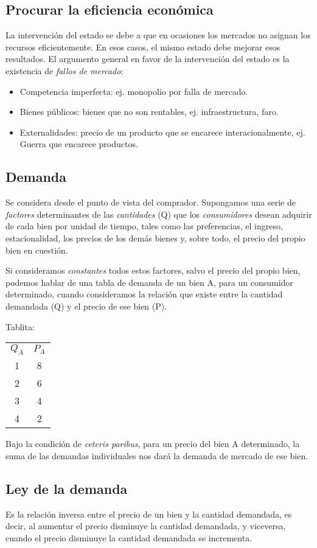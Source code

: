 \subsection{Procurar la eficiencia económica}

La intervención del estado se debe a que en ocasiones 
los mercados no asignan los recursos eficientemente.
En esos casos, 
el mismo estado debe mejorar esos resultados.
El argumento general en favor de la intervención del estado es la existencia de \textit{fallos de mercado}:
\begin{itemize}
    \item Competencia imperfecta: ej. monopolio por falla de mercado.
    \item Bienes públicos: bienes que no son rentables, ej. infraestructura, faro.
    \item Externalidades: precio de un producto que se encarece interacionalmente, 
    ej. Guerra que encarece productos.
\end{itemize}

\subsection{Demanda}

Se considera desde el punto de vista del comprador.
Supongamos una serie de \textit{factores} determinantes de las \textit{cantidades} (Q)
que los \textit{consumidores} desean adquirir de cada bien por unidad de tiempo,
tales como las preferencias, el ingreso, 
estacionalidad, los precios de los demás bienes y, sobre todo,
el precio del propio bien en cuestión.

Si consideramos \textit{constantes} todos estos factores, 
salvo el precio del propio bien,
podemos hablar de una tabla de demanda de un bien A,
para un consumidor determinado,
cuando consideramos la relación que existe entre la cantidad demandada (Q)
y el precio de ese bien (P).

Tablita:

\begin{tabular}{ c c }
    \(Q_A\) & \(P_A\) \\
    1& 8 \\
    2& 6 \\
    3& 4 \\
    4& 2 \\
\end{tabular}

Bajo la condición de \textit{ceteris paribus},
para un precio del bien A determinado,
la suma de las demandas individuales nos dará la demanda de mercado de ese bien.

\subsection{Ley de la demanda}

Es la relación inversa entre el precio de un bien y la cantidad demandada,
es decir, 
al aumentar el precio disminuye la cantidad demandada, 
y viceversa,
cuando el precio disminuye la cantidad demandada se incrementa.
